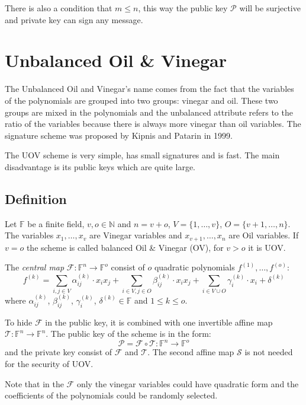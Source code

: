 \documentclass[thesis=M,english]{FITthesis}[2019/12/23]
\begin{document}
There is also a condition that $m \leq n$, this way the public key $\mathcal{P}$ will be surjective and private key can sign any message.

\section{Unbalanced Oil \& Vinegar}
The Unbalanced Oil and Vinegar's name comes from the fact that the variables of the polynomials are grouped into two groups: vinegar and oil. These two groups are mixed in the polynomials and the unbalanced attribute refers to the ratio of the variables because there is always more vinegar than oil variables. The signature scheme was proposed by Kipnis and Patarin in 1999.

\bigskip
\noindent
The UOV scheme is very simple, has small signatures and is fast. The main disadvantage is its public keys which are quite large.

\subsection{Definition}
Let $\mathbb{F}$ be a finite field, $v,o \in \mathbb{N}$ and $n=v+o$, $V=\{1, \ldots, v\}$, $O=\{v+1, \ldots, n\}$. The variables $x_1, \ldots, x_v$ are Vinegar variables and $x_{v+1}, \ldots, x_n$ are Oil variables. If $v=o$ the scheme is called balanced Oil \& Vinegar (OV), for $v>o$ it is UOV.

\bigskip
\noindent
The \textit{central map} $\mathcal{F}:\mathbb{F}^n \rightarrow \mathbb{F}^o$ consist of $o$ quadratic polynomials $f^{(1)}, \ldots, f^{(o)}$:
\[
f^{(k)} = \sum\limits_{i,j \in V}{\alpha_{ij}^{(k)} \cdot x_ix_j} + \sum\limits_{i \in V,j \in O}{\beta_{ij}^{(k)} \cdot x_ix_j}+ \sum\limits_{i \in V \cup O}{\gamma_{i}^{(k)} \cdot x_i} + \delta^{(k)}
\]
where $\alpha_{ij}^{(k)}$, $\beta_{ij}^{(k)}$, $\gamma_{i}^{(k)}$, $\delta^{(k)} \in \mathbb{F}$ and $1 \leq k \leq o$.

\bigskip
\noindent
To hide $\mathcal{F}$ in the public key, it is combined with one invertible affine map $\mathcal{T}: \mathbb{F}^n \rightarrow \mathbb{F}^n$. The public key of the scheme is in the form:
\[
\mathcal{P} = \mathcal{F} \circ \mathcal{T} : \mathbb{F}^n \rightarrow \mathbb{F}^o
\]
and the private key consist of $\mathcal{F}$ and $\mathcal{T}$. The second affine map $\mathcal{S}$ is not needed for the security of UOV.

\bigskip
\noindent
Note that in the $\mathcal{F}$ only the vinegar variables could have quadratic form and the coefficients of the polynomials could be randomly selected.
\end{document}
